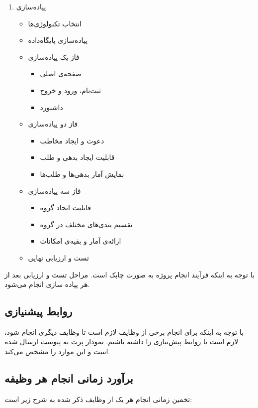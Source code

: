 \begin{enumerate}
\begin{itemize}
	\end{itemize}
	\item
	پیاده‌سازی
	\begin{itemize}
		\item
		انتخاب تکنولوژی‌ها
		\item
		پیاده‌سازی پایگاه‌داده
		\item
		فاز یک پیاده‌سازی
		\begin{itemize}
			\item
			صفحه‌ی اصلی
			\item
			ثبت‌نام، ورود و خروج
			\item
			داشبورد
		\end{itemize}
		\item
		فاز دو پیاده‌سازی
		\begin{itemize}
		    \item
		    دعوت و ایجاد مخاطب
		    \item
		    قابلیت ایجاد بدهی و طلب
			\item
			نمایش آمار بدهی‌ها و طلب‌ها
		\end{itemize}
		\item
		فاز سه پیاده‌سازی
		\begin{itemize}
			\item
			قابلیت ایجاد گروه
			\item
			تقسیم بندی‌های مختلف در گروه
			\item
			ارائه‌ی آمار و بقیه‌ی امکانات
		\end{itemize}
		
		\item 
		تست و ارزیابی نهایی
		
	\end{itemize}
\end{enumerate}

با توجه به اینکه فرآیند انجام پروژه به صورت چابک است. مراحل تست و ارزیابی بعد از هر پپاده سازی انجام می‌شود.


\subsection{روابط پیشنیازی}

با توجه به اینکه برای انجام برخی از وظایف لازم است تا وظایف دیگری انجام شود، لازم است تا روابط پیش‌نیازی را داشته باشیم.  نمودار پرت
به پیوست ارسال شده است و این موارد را مشخص می‌کند.

\subsection{برآورد زمانی انجام هر وظیفه}
تخمین زمانی انجام هر یک از وظایف ذکر شده به شرح زیر است:


